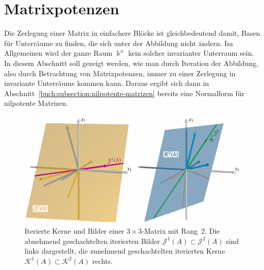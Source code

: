 %
%
%
\section{Matrixpotenzen
\label{buch:section:grundlagen}}
Die Zerlegung einer Matrix in einfachere Blöcke ist gleichbedeutend
damit, Basen für Unterräume zu finden, die sich unter der Abbildung
nicht ändern.
Im Allgemeinen wird der ganze Raum $\Bbbk^n$ kein solcher invarianter
Unterraum sein.
In diesem Abschnitt soll gezeigt werden, wie man durch Iteration
der Abbildung, also durch Betrachtung von Matrixpotenzen, immer zu
%
einer Zerlegung in invariante Unterräume kommen kann.
%
%
Daraus ergibt sich dann in Abschnitt~\ref{buch:subsection:nilpotente-matrizen}
bereits eine Normalform für nilpotente Matrizen.
%

\begin{figure}
\centering
\includegraphics[width=\textwidth]{chapters/40-eigenwerte/images/kernbild.pdf}
\caption{Iterierte Kerne und Bilder einer $3\times 3$-Matrix mit Rang~2.
Die abnehmend geschachtelten iterierten Bilder
$\mathcal{J}^1(A) \subset \mathcal{J}^2(A)$
sind links dargestellt, die zunehmend geschachtelten iterierten Kerne
$\mathcal{K}^1(A) \subset \mathcal{K}^2(A)$ rechts.
\label{buch:eigenwerte:img:kernbild}}
\end{figure}

